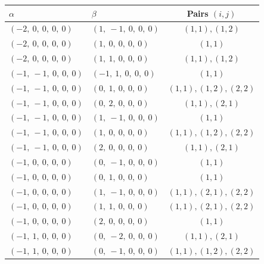 \documentclass[11pt]{article}
\theoremstyle{definition}
\begin{document}
\begin{tabular}{|l|l|c|}
    \hline
    $\alpha$ & $\beta$ & Pairs $(i,j)$ \\
    \hline
    $\left( -2, \  0, \  0, \  0, \  0\right)$ & $\left( 1, \  -1, \  0, \  0, \  0\right)$ & $(1,1), (1,2)$ \\
    \hline
    $\left( -2, \  0, \  0, \  0, \  0\right)$ & $\left( 1, \  0, \  0, \  0, \  0\right)$ & $(1,1)$ \\
    \hline
    $\left( -2, \  0, \  0, \  0, \  0\right)$ & $\left( 1, \  1, \  0, \  0, \  0\right)$ & $(1,1), (1,2)$ \\
    \hline
    $\left( -1, \  -1, \  0, \  0, \  0\right)$ & $\left( -1, \  1, \  0, \  0, \  0\right)$ & $(1,1)$ \\
    \hline
    $\left( -1, \  -1, \  0, \  0, \  0\right)$ & $\left( 0, \  1, \  0, \  0, \  0\right)$ & $(1,1), (1,2), (2,2)$ \\
    \hline
    $\left( -1, \  -1, \  0, \  0, \  0\right)$ & $\left( 0, \  2, \  0, \  0, \  0\right)$ & $(1,1), (2,1)$ \\
    \hline
    $\left( -1, \  -1, \  0, \  0, \  0\right)$ & $\left( 1, \  -1, \  0, \  0, \  0\right)$ & $(1,1)$ \\
    \hline
    $\left( -1, \  -1, \  0, \  0, \  0\right)$ & $\left( 1, \  0, \  0, \  0, \  0\right)$ & $(1,1), (1,2), (2,2)$ \\
    \hline
    $\left( -1, \  -1, \  0, \  0, \  0\right)$ & $\left( 2, \  0, \  0, \  0, \  0\right)$ & $(1,1), (2,1)$ \\
    \hline
    $\left( -1, \  0, \  0, \  0, \  0\right)$ & $\left( 0, \  -1, \  0, \  0, \  0\right)$ & $(1,1)$ \\
    \hline
    $\left( -1, \  0, \  0, \  0, \  0\right)$ & $\left( 0, \  1, \  0, \  0, \  0\right)$ & $(1,1)$ \\
    \hline
    $\left( -1, \  0, \  0, \  0, \  0\right)$ & $\left( 1, \  -1, \  0, \  0, \  0\right)$ & $(1,1), (2,1), (2,2)$ \\
    \hline
    $\left( -1, \  0, \  0, \  0, \  0\right)$ & $\left( 1, \  1, \  0, \  0, \  0\right)$ & $(1,1), (2,1), (2,2)$ \\
    \hline
    $\left( -1, \  0, \  0, \  0, \  0\right)$ & $\left( 2, \  0, \  0, \  0, \  0\right)$ & $(1,1)$ \\
    \hline
    $\left( -1, \  1, \  0, \  0, \  0\right)$ & $\left( 0, \  -2, \  0, \  0, \  0\right)$ & $(1,1), (2,1)$ \\
    \hline
    $\left( -1, \  1, \  0, \  0, \  0\right)$ & $\left( 0, \  -1, \  0, \  0, \  0\right)$ & $(1,1), (1,2), (2,2)$ \\

\end{tabular}
\end{document}
